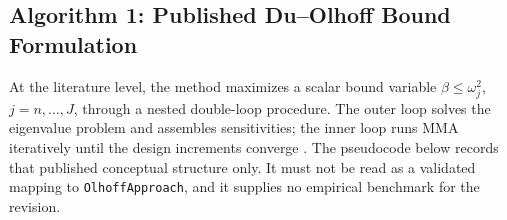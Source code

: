\documentclass[12pt,a4paper]{article}
\begin{document}
\subsection{Algorithm 1: Published Du--Olhoff Bound Formulation}
\label{subsec:alg-olhoff}

At the literature level, the method maximizes a scalar bound variable
$\beta \leq \omega_j^2$, $j = n,\ldots,J$, through a nested double-loop
procedure.  The outer loop solves the eigenvalue problem and assembles
sensitivities; the inner loop runs MMA iteratively until the design
increments converge \cite{Olhoff2014}.  The pseudocode below records that
published conceptual structure only.  It must not be read as a validated
mapping to \texttt{OlhoffApproach}, and it supplies no empirical benchmark
for the revision.
\end{document}
